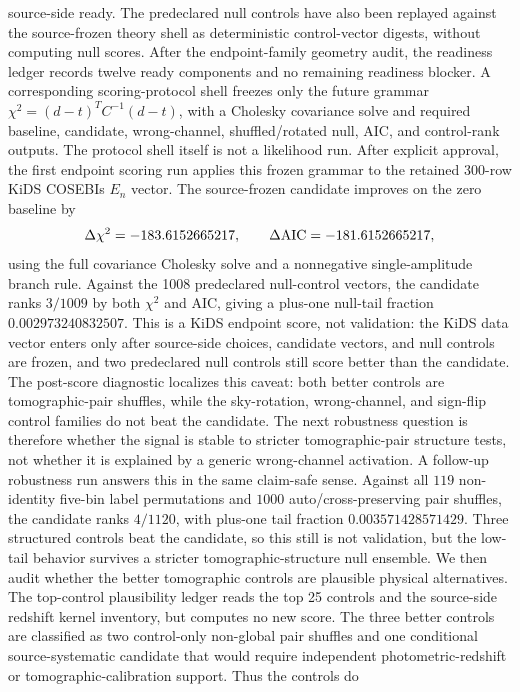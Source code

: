\documentclass[11pt]{article}
\begin{document}
source-side ready. The predeclared null controls have also been replayed against
the source-frozen theory shell as deterministic control-vector digests, without
computing null scores. After the endpoint-family geometry audit, the readiness
ledger records twelve ready components and no remaining readiness blocker.
A corresponding scoring-protocol shell freezes only the future grammar
\(\chi^2=(d-t)^T C^{-1}(d-t)\), with a Cholesky covariance solve and required
baseline, candidate, wrong-channel, shuffled/rotated null, AIC, and control-rank
outputs. The protocol shell itself is not a likelihood run. After explicit
approval, the first endpoint scoring run applies this frozen grammar to the
retained 300-row KiDS COSEBIs \(E_n\) vector. The source-frozen candidate
improves on the zero baseline by
\[
  \Delta\chi^2=-183.6152665217,
  \qquad
  \Delta{\rm AIC}=-181.6152665217,
\]
using the full covariance Cholesky solve and a nonnegative single-amplitude
branch rule. Against the 1008 predeclared null-control vectors, the candidate
ranks \(3/1009\) by both \(\chi^2\) and AIC, giving a plus-one null-tail
fraction \(0.002973240832507\). This is a KiDS endpoint score, not validation:
the KiDS data vector enters only after source-side choices, candidate vectors,
and null controls are frozen, and two predeclared null controls still score
better than the candidate.
The post-score diagnostic localizes this caveat: both better controls are
tomographic-pair shuffles, while the sky-rotation, wrong-channel, and sign-flip
control families do not beat the candidate. The next robustness question is
therefore whether the signal is stable to stricter tomographic-pair structure
tests, not whether it is explained by a generic wrong-channel activation.
A follow-up robustness run answers this in the same claim-safe sense. Against
all \(119\) non-identity five-bin label permutations and \(1000\)
auto/cross-preserving pair shuffles, the candidate ranks \(4/1120\), with
plus-one tail fraction \(0.003571428571429\). Three structured controls beat
the candidate, so this still is not validation, but the low-tail behavior
survives a stricter tomographic-structure null ensemble.
We then audit whether the better tomographic controls are plausible physical
alternatives. The top-control plausibility ledger reads the top 25 controls and
the source-side redshift kernel inventory, but computes no new score. The three
better controls are classified as two control-only non-global pair shuffles and
one conditional source-systematic candidate that would require independent
photometric-redshift or tomographic-calibration support. Thus the controls do
\end{document}
